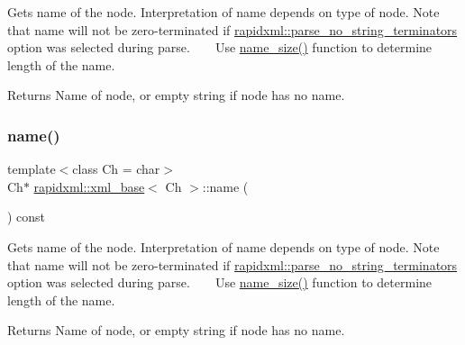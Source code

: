 Gets name of the node. Interpretation of name depends on type of node. Note that name will not be zero-\/terminated if \mbox{\hyperlink{namespacerapidxml_af3fc88ba6bee33482a2db81b1da36ea1}{rapidxml\+::parse\+\_\+no\+\_\+string\+\_\+terminators}} option was selected during parse. ~\newline
~\newline
 Use \mbox{\hyperlink{classrapidxml_1_1xml__base_a20c8ffbe0c7a0b4231681ab8b99330a4}{name\+\_\+size()}} function to determine length of the name. \begin{DoxyReturn}{Returns}
Name of node, or empty string if node has no name. 
\end{DoxyReturn}
\mbox{\label{classrapidxml_1_1xml__base_aef8ae147fbee59209f714274afc80dc4}} 
\subsubsection{\texorpdfstring{name()}{name()}\hspace{0.1cm}{\footnotesize\ttfamily [2/6]}}
{\footnotesize\ttfamily template$<$class Ch  = char$>$ \\
Ch$\ast$ \mbox{\hyperlink{classrapidxml_1_1xml__base}{rapidxml\+::xml\+\_\+base}}$<$ Ch $>$\+::name (\begin{DoxyParamCaption}{ }\end{DoxyParamCaption}) const\hspace{0.3cm}{\ttfamily [inline]}}

Gets name of the node. Interpretation of name depends on type of node. Note that name will not be zero-\/terminated if \mbox{\hyperlink{namespacerapidxml_af3fc88ba6bee33482a2db81b1da36ea1}{rapidxml\+::parse\+\_\+no\+\_\+string\+\_\+terminators}} option was selected during parse. ~\newline
~\newline
 Use \mbox{\hyperlink{classrapidxml_1_1xml__base_a20c8ffbe0c7a0b4231681ab8b99330a4}{name\+\_\+size()}} function to determine length of the name. \begin{DoxyReturn}{Returns}
Name of node, or empty string if node has no name. 
\end{DoxyReturn}
\mbox{\label{classrapidxml_1_1xml__base_ae55060ae958c6e6465d6c8db852ec6ce}} 
